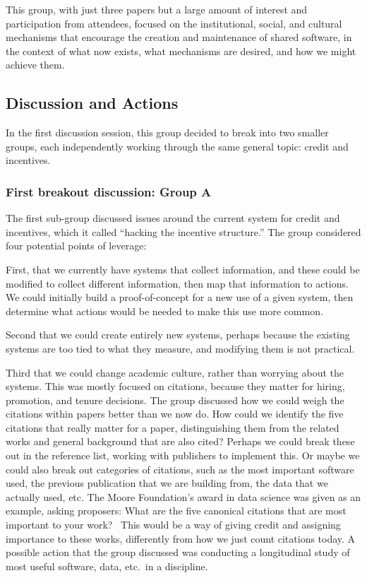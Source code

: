 \documentclass[11pt, oneside]{amsart}
\newcommand{\note}[1]{ {\textcolor{blueish}    { ***Note:      #1 }}}
\begin{document}

This group, with just three papers but a large amount of interest and
participation from attendees, focused on the institutional, social, and cultural
mechanisms that encourage the creation and maintenance of shared software, in the
context of what now exists, what mechanisms are desired, and how
we might achieve them.


\subsection{Discussion and Actions}

In the first discussion session, this group decided to break into two smaller groups,
each independently working through the same general topic: credit and incentives.

\subsubsection{First breakout discussion: Group A}
The first sub-group discussed issues around the current system for credit and
incentives, which it called ``hacking the incentive structure.'' The
group considered four potential points of leverage:

First, that we currently have systems that collect information, and these could
be modified to collect different information, then map that information to
actions. We could initially build a proof-of-concept for a new use of a given
system, then determine what actions would be needed to make this use more
common.

Second that we could create entirely new systems, perhaps because the existing
systems are too tied to what they measure, and modifying them is not practical.

Third that we could change academic culture, rather than worrying about the
systems. This was mostly focused on citations, because they matter for hiring,
promotion, and tenure decisions. The group discussed how we could weigh the
citations within papers better than we now do. How could we identify the five
citations that really matter for a paper, distinguishing them from the related
works and general background that are also cited? Perhaps we could break these
out in the reference list, working with publishers to implement this. Or maybe
we could also break out categories of citations, such as the most important
software used, the previous publication that we are building from, the data that
we actually used, etc. The Moore Foundation's award in data science was given as
an example, asking proposers: What are the five canonical citations that are
most important to your work?~\cite{moore-canonical} This would be a way of
giving credit and assigning importance to these works, differently from how we
just count citations today. A possible action that the group discussed was
conducting a longitudinal study of most useful software, data, etc.\ in a
discipline.
\end{document}
